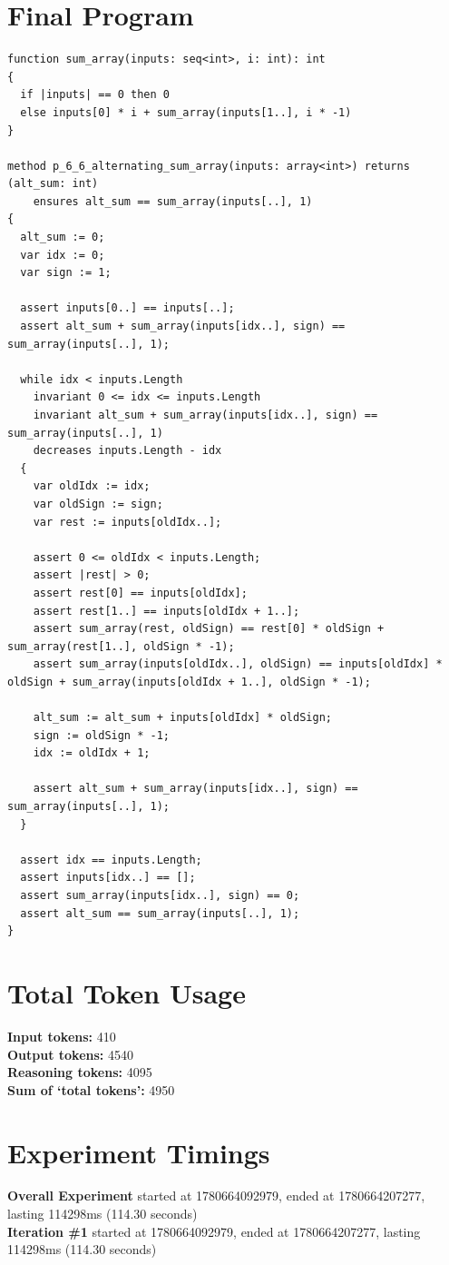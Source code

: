 \documentclass{article}
\begin{document}
\section*{Final Program}
\begin{lstlisting}
function sum_array(inputs: seq<int>, i: int): int
{
  if |inputs| == 0 then 0
  else inputs[0] * i + sum_array(inputs[1..], i * -1)
}

method p_6_6_alternating_sum_array(inputs: array<int>) returns (alt_sum: int)
	ensures alt_sum == sum_array(inputs[..], 1)
{
  alt_sum := 0;
  var idx := 0;
  var sign := 1;

  assert inputs[0..] == inputs[..];
  assert alt_sum + sum_array(inputs[idx..], sign) == sum_array(inputs[..], 1);

  while idx < inputs.Length
    invariant 0 <= idx <= inputs.Length
    invariant alt_sum + sum_array(inputs[idx..], sign) == sum_array(inputs[..], 1)
    decreases inputs.Length - idx
  {
    var oldIdx := idx;
    var oldSign := sign;
    var rest := inputs[oldIdx..];

    assert 0 <= oldIdx < inputs.Length;
    assert |rest| > 0;
    assert rest[0] == inputs[oldIdx];
    assert rest[1..] == inputs[oldIdx + 1..];
    assert sum_array(rest, oldSign) == rest[0] * oldSign + sum_array(rest[1..], oldSign * -1);
    assert sum_array(inputs[oldIdx..], oldSign) == inputs[oldIdx] * oldSign + sum_array(inputs[oldIdx + 1..], oldSign * -1);

    alt_sum := alt_sum + inputs[oldIdx] * oldSign;
    sign := oldSign * -1;
    idx := oldIdx + 1;

    assert alt_sum + sum_array(inputs[idx..], sign) == sum_array(inputs[..], 1);
  }

  assert idx == inputs.Length;
  assert inputs[idx..] == [];
  assert sum_array(inputs[idx..], sign) == 0;
  assert alt_sum == sum_array(inputs[..], 1);
}
\end{lstlisting}
\section*{Total Token Usage}
\textbf{Input tokens: }410
\\\textbf{Output tokens: }4540
\\\textbf{Reasoning tokens: }4095
\\\textbf{Sum of `total tokens': }4950
\section*{Experiment Timings}
\textbf{Overall Experiment} started at 1780664092979, ended at 1780664207277, lasting 114298ms (114.30 seconds)
\\\textbf{Iteration \#1} started at 1780664092979, ended at 1780664207277, lasting 114298ms (114.30 seconds)
\end{document}

